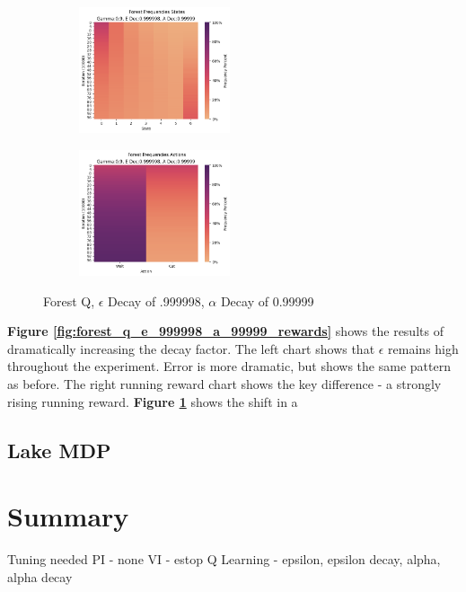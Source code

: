 \documentclass[letterpaper]{article} %
\begin{document}
\begin{figure}[!htb]
	\begin{subfigure}[b]{0.25\textwidth}
		\centering
		\includegraphics[width=1.75in]{Figures/Forest_Frequencies_States_Gamma_0_9__E_Dec_0_999998__A_Dec_0_99999.png}
  	\end{subfigure}%
	\begin{subfigure}[b]{0.25\textwidth}
		\centering
		\includegraphics[width=1.75in]{Figures/Forest_Frequencies_Actions_Gamma_0_9__E_Dec_0_999998__A_Dec_0_99999.png}
  	\end{subfigure}%
\caption{Forest Q,  $\epsilon$ Decay of .999998, $\alpha$ Decay of 0.99999}
\label{fig:forest_q_e_999998_a_99999_frequencies}
\end{figure}

\textbf{Figure \ref{fig:forest_q_e_999998_a_99999_rewards}} shows the results of dramatically increasing the decay factor.  The left chart shows that $\epsilon$ remains high throughout the experiment.  Error is more dramatic, but shows the same pattern as before.  The right running reward chart shows the key difference - a strongly rising running reward.  \textbf{Figure \ref{fig:forest_q_e_999998_a_99999_frequencies}} shows the shift in a



\subsection{Lake MDP} 


\section{Summary}
Tuning needed
PI - none
VI - estop
Q Learning - epsilon, epsilon decay, alpha, alpha decay
\end{document}
